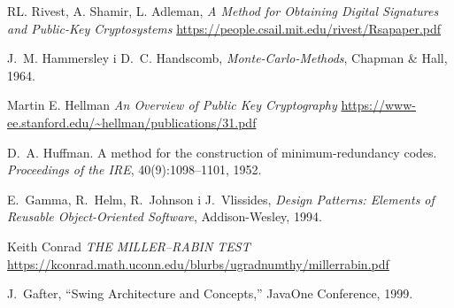 \documentclass{ieeetj}
\begin{document}

\begin{thebibliography}{1}

 RL. Rivest, A. Shamir, L. Adleman, \emph{A Method for Obtaining Digital
Signatures and Public-Key Cryptosystems} \url{https://people.csail.mit.edu/rivest/Rsapaper.pdf}

 J.~M. Hammersley i D.~C. Handscomb, \emph{Monte-Carlo-Methods}, Chapman \& Hall, 1964.

 Martin E. Hellman \emph{An Overview of Public Key Cryptography} \url{https://www-ee.stanford.edu/~hellman/publications/31.pdf}

 D.~A. Huffman.
\newblock A method for the construction of minimum‐redundancy codes.
\newblock \emph{Proceedings of the IRE}, 40(9):1098–1101, 1952.

 E.~Gamma, R.~Helm, R.~Johnson i J.~Vlissides, \emph{Design Patterns: Elements of Reusable Object-Oriented Software}, Addison-Wesley, 1994.

 Keith Conrad \emph{THE MILLER–RABIN TEST} \url{https://kconrad.math.uconn.edu/blurbs/ugradnumthy/millerrabin.pdf}


 J.~Gafter, “Swing Architecture and Concepts,” JavaOne Conference, 1999.
\end{thebibliography}
\end{document}
